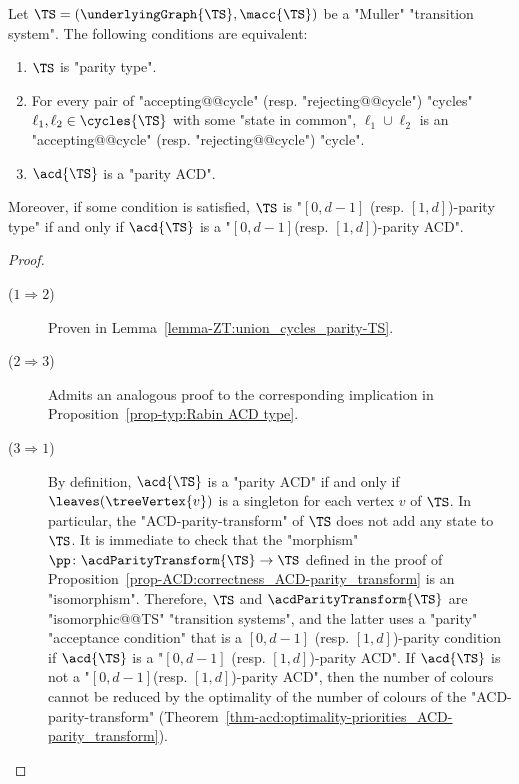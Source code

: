\documentclass{theoretics}
\begin{document}
\begin{proposition}\label{prop-typ:parity ACD type}
	Let $\TS = (\underlyingGraph{\TS}, \macc{\TS})$ be a "Muller" "transition system". The following conditions are equivalent:
	\begin{enumerate}
		\item $\TS$ is "parity type".
		\item For every pair of "accepting@@cycle" (resp. "rejecting@@cycle") "cycles" $\ell_1, \ell_2\in \cycles{\TS}$  with some "state in common",  $\ell_1\cup \ell_2$ is an "accepting@@cycle" (resp. "rejecting@@cycle") "cycle".
		\item $\acd{\TS}$ is a "parity ACD". 
	\end{enumerate}
	Moreover, if some condition is satisfied, $\TS$ is "$[0,d-1]$ (resp. $[1,d]$)-parity type" if and only if $\acd{\TS}$ is a "$[0,d-1]$(resp. $[1,d]$)-parity ACD".
\end{proposition}
\begin{proof}
	\begin{description}
		\item[($1 \Rightarrow 2$)] Proven in Lemma~\ref{lemma-ZT:union_cycles_parity-TS}.
		
		\item[($2 \Rightarrow 3$)] Admits an analogous proof to the corresponding implication in Proposition~\ref{prop-typ:Rabin ACD type}.
		
		\item[($3 \Rightarrow 1$)] By definition, $\acd{\TS}$ is a "parity ACD" if and only if $\leaves(\treeVertex{v})$ is a singleton for each vertex $v$ of $\TS$. In particular, the "ACD-parity-transform" of $\TS$ does not add any state to $\TS$. It is immediate to check that the "morphism" $\pp\colon \acdParityTransform{\TS} \to \TS$ defined in the proof of Proposition~\ref{prop-ACD:correctness_ACD-parity_transform} is an "isomorphism". Therefore, $\TS$ and $\acdParityTransform{\TS}$ are "isomorphic@@TS" "transition systems", and the latter uses a "parity" "acceptance condition" that is a $[0,d-1]$ (resp. $[1,d]$)-parity condition if $\acd{\TS}$ is a "$[0,d-1]$ (resp. $[1,d]$)-parity ACD". If $\acd{\TS}$ is not a "$[0,d-1]$(resp. $[1,d]$)-parity ACD", then the number of colours cannot be reduced by the optimality of the number of colours of the "ACD-parity-transform" (Theorem~\ref{thm-acd:optimality-priorities_ACD-parity_transform}).\qedhere
	\end{description}
\end{proof}
\end{document}
